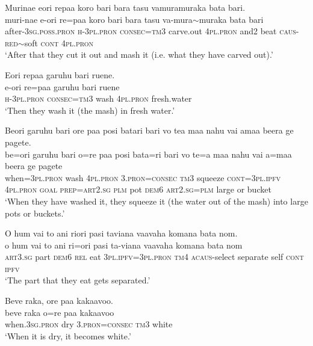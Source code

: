 \ea\label{ex:text2-48}
Murinae eori repaa koro bari bara tasu vamuramuraka bata bari.\\
\gll muri-nae	e-ori	re=paa	koro	bari	bara	tasu	va-mura{$\sim$}muraka	bata	bari\\
     after-3\textsc{sg}.\textsc{poss}.\textsc{pron}	\textsc{h}-3\textsc{pl}.\textsc{pron}	\textsc{consec}=\textsc{tm}3	carve.out	4\textsc{pl}.\textsc{pron}	and2	beat	\textsc{caus}-\textsc{red}{$\sim$}soft	\textsc{cont}	4\textsc{pl}.\textsc{pron}\\
\glt `After that they cut it out and mash it (i.e. what they have carved out).'
\z

\ea\label{ex:text2-49}
Eori repaa garuhu bari ruene.\\
\gll e-ori	re=paa	garuhu	bari	ruene\\
     \textsc{h}-3\textsc{pl}.\textsc{pron}	\textsc{consec}=\textsc{tm}3	wash	4\textsc{pl}.\textsc{pron}	fresh.water\\
\glt `Then they wash it (the mash) in fresh water.'
\z

\ea\label{ex:text2-50}
Beori garuhu bari ore paa posi batari bari vo tea maa nahu vai amaa beera ge pagete.\\
\gll be=ori	garuhu	bari	o=re	paa	posi	bata=ri	bari	vo	te=a	maa	nahu	vai	a=maa	beera	ge	pagete\\
     when=3\textsc{pl}.\textsc{pron}	wash	4\textsc{pl}.\textsc{pron}	3.\textsc{pron}=\textsc{consec}	\textsc{tm}3	squeeze	\textsc{cont}=3\textsc{pl}.\textsc{ipfv}	4\textsc{pl}.\textsc{pron}	\textsc{goal}	\textsc{prep}=\textsc{art}2.\textsc{sg}	\textsc{plm}	pot	\textsc{dem}6	\textsc{art}2.\textsc{sg}=\textsc{plm}	large	or	bucket\\
\glt `When they have washed it, they squeeze it (the water out of the mash) into large pots or buckets.'
\z

\newpage
\ea\label{ex:text2-51}
O hum vai to ani riori pasi taviana vaavaha komana bata nom.\\
\gll o	hum	vai	to	ani	ri=ori	pasi	ta-viana	vaavaha	komana	bata	nom\\
     \textsc{art}3.\textsc{sg}	part	\textsc{dem}6	\textsc{rel}	eat	3\textsc{pl}.\textsc{ipfv}=3\textsc{pl}.\textsc{pron}	\textsc{tm}4	\textsc{acaus}-select	separate	self	\textsc{cont}	\textsc{ipfv}\\
\glt `The part that they eat gets separated.'
\z

\ea\label{ex:text2-52}
Beve raka, ore paa kakaavoo.\\
\gll beve	raka	o=re	paa	kakaavoo\\
     when.3\textsc{sg}.\textsc{pron}	dry	3.\textsc{pron}=\textsc{consec}	\textsc{tm}3	white\\
\glt `When it is dry, it becomes white.'
\z

